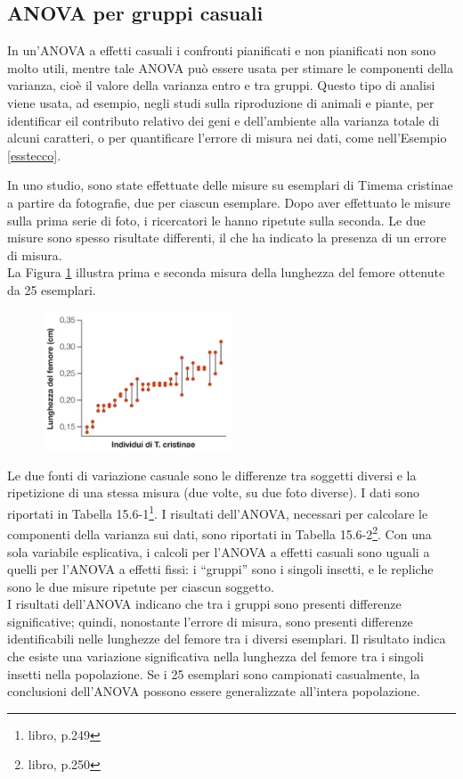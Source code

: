 \documentclass[10pt, draft]{book}
\newcounter{example}[section]
\begin{document}
\subsection{ANOVA per gruppi casuali}

In un'ANOVA a effetti casuali i confronti pianificati e non pianificati non sono molto utili, mentre tale ANOVA può essere usata per stimare le componenti della varianza, cioè il valore della varianza entro e tra gruppi. Questo tipo di analisi viene usata, ad esempio, negli studi sulla riproduzione di animali e piante, per identificar eil contributo relativo dei geni e dell'ambiente alla varianza totale di alcuni caratteri, o per quantificare l'errore di misura nei dati, come nell'Esempio \ref{esstecco}.

\begin{example}\label{esstecco}
    In uno studio, sono state effettuate delle misure su esemplari di Timema cristinae a partire da fotografie, due per ciascun esemplare. Dopo aver effettuato le misure sulla prima serie di foto, i ricercatori le hanno ripetute sulla seconda. Le due misure sono spesso risultate differenti, il che ha indicato la presenza di un errore di misura.\\
    La Figura \ref{fig15.6-1} illustra prima e seconda misura della lunghezza del femore ottenute da 25 esemplari.\\
    \begin{figure}[H]
        \centering
        \includegraphics[width=0.5\textwidth]{fig15.6-1}
        \caption{\small{}}
        \label{fig15.6-1}
    \end{figure}
    Le due fonti di variazione casuale sono le differenze tra soggetti diversi e la ripetizione di una stessa misura (due volte, su due foto diverse).
    I dati sono riportati in Tabella 15.6-1\footnote{libro, p.249}.
    I risultati dell'ANOVA, necessari per calcolare le componenti della varianza sui dati, sono riportati in Tabella 15.6-2\footnote{libro, p.250}.
    Con una sola variabile esplicativa, i calcoli per l'ANOVA a effetti casuali sono uguali a quelli per l'ANOVA a effetti fissi: i ``gruppi'' sono i singoli insetti, e le repliche sono le due misure ripetute per ciascun soggetto.\\
    I risultati dell'ANOVA indicano che tra i gruppi sono presenti differenze significative; quindi, nonostante l'errore di misura, sono presenti differenze identificabili nelle lunghezze del femore tra i diversi esemplari. Il risultato indica che esiste una variazione significativa nella lunghezza del femore tra i singoli insetti nella popolazione. Se i 25 esemplari sono campionati casualmente, la conclusioni dell'ANOVA possono essere generalizzate all'intera popolazione.\\


\end{example}
\end{document}
